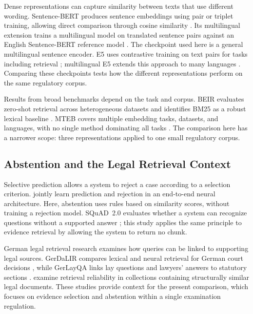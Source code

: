 \documentclass[11pt]{article}
\begin{document}
Dense representations can capture similarity between texts that use different wording. Sentence-BERT produces sentence embeddings using pair or triplet training, allowing direct comparison through cosine similarity \citep{reimers-gurevych-2019-sentence}. Its multilingual extension trains a multilingual model on translated sentence pairs against an English Sentence-BERT reference model \citep{reimers-gurevych-2020-making}. The checkpoint used here is a general multilingual sentence encoder. E5 uses contrastive training on text pairs for tasks including retrieval \citep{wang2022text}; multilingual E5 extends this approach to many languages \citep{wang2024multilingual}. Comparing these checkpoints tests how the different representations perform on the same regulatory corpus.

Results from broad benchmarks depend on the task and corpus. BEIR evaluates zero-shot retrieval across heterogeneous datasets and identifies BM25 as a robust lexical baseline \citep{thakur2021beir}. MTEB covers multiple embedding tasks, datasets, and languages, with no single method dominating all tasks \citep{muennighoff-etal-2023-mteb}. The comparison here has a narrower scope: three representations applied to one small regulatory corpus.

\subsection{Abstention and the Legal Retrieval Context}

Selective prediction allows a system to reject a case according to a selection criterion. \citet{pmlr-v97-geifman19a} jointly learn prediction and rejection in an end-to-end neural architecture. Here, abstention uses rules based on similarity scores, without training a rejection model. SQuAD~2.0 evaluates whether a system can recognize questions without a supported answer \citep{rajpurkar-etal-2018-know}; this study applies the same principle to evidence retrieval by allowing the system to return no chunk.

German legal retrieval research examines how queries can be linked to supporting legal sources. GerDaLIR compares lexical and neural retrieval for German court decisions \citep{wrzalik-krechel-2021-gerdalir}, while GerLayQA links lay questions and lawyers' answers to statutory sections \citep{buttner-habernal-2024-answering}. \citet{reuter-etal-2025-towards} examine retrieval reliability in collections containing structurally similar legal documents. These studies provide context for the present comparison, which focuses on evidence selection and abstention within a single examination regulation.
\end{document}
